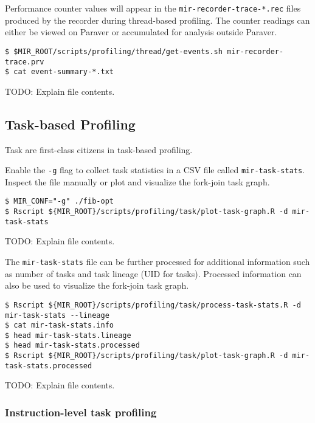 \documentclass[11pt,a4paper]{article}
\begin{document}
Performance counter values will appear in the \texttt{mir-recorder-trace-*.rec} files produced by the recorder during thread-based profiling. The counter readings can either be viewed on Paraver or accumulated for analysis outside Paraver.

\begin{lstlisting}[style=MyInputStyle]
$ $MIR_ROOT/scripts/profiling/thread/get-events.sh mir-recorder-trace.prv
$ cat event-summary-*.txt
\end{lstlisting}

TODO: Explain file contents.

\subsection{Task-based Profiling}\label{task-based-profiling}

Task are first-class citizens in task-based profiling.

Enable the \texttt{-g} flag to collect task statistics in a CSV file called \texttt{mir-task-stats}. Inspect the file manually or plot and visualize the fork-join task graph.

\begin{lstlisting}[style=MyInputStyle]
$ MIR_CONF="-g" ./fib-opt
$ Rscript ${MIR_ROOT}/scripts/profiling/task/plot-task-graph.R -d mir-task-stats
\end{lstlisting}

TODO: Explain file contents.

The \texttt{mir-task-stats} file can be further processed for additional information such as number of tasks and task lineage (UID for tasks). Processed information can also be used to visualize the fork-join task graph.

\begin{lstlisting}[style=MyInputStyle]
$ Rscript ${MIR_ROOT}/scripts/profiling/task/process-task-stats.R -d mir-task-stats --lineage
$ cat mir-task-stats.info
$ head mir-task-stats.lineage
$ head mir-task-stats.processed
$ Rscript ${MIR_ROOT}/scripts/profiling/task/plot-task-graph.R -d mir-task-stats.processed
\end{lstlisting}

TODO: Explain file contents.

\subsubsection{Instruction-level task profiling}\label{instruction-level-task-profiling}
\end{document}
